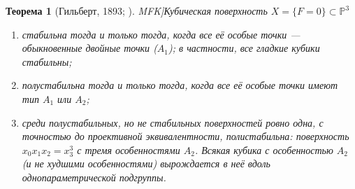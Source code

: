 \documentclass[11pt,a4paper]{article}
\theoremstyle{plain}
\newtheorem{theorem}{Теорема}[section]
\theoremstyle{definition}
\theoremstyle{remark}
\newcommand{\PP}{\mathbb{P}}
\begin{document}
\begin{theorem}[Гильберт, 1893; \cite[гл.~4, \S\,2]{MFK}]\label{thm:Hilbert}
Кубическая поверхность $X=\{F=0\}\subset\PP^3$
\begin{enumerate}
\item стабильна тогда и только тогда, когда все её особые точки --- обыкновенные двойные точки
($A_1$); в частности, все гладкие кубики стабильны;
\item полустабильна тогда и только тогда, когда все её особые точки имеют тип $A_1$ или $A_2$;
\item среди полустабильных, но не стабильных поверхностей ровно одна, с точностью до проективной
эквивалентности, полистабильна: поверхность $x_0x_1x_2=x_3^3$ с тремя особенностями $A_2$. Всякая
кубика с особенностью $A_2$ (и не худшими особенностями) вырождается в неё вдоль
однопараметрической подгруппы.
\end{enumerate}
\end{theorem}
\end{document}
